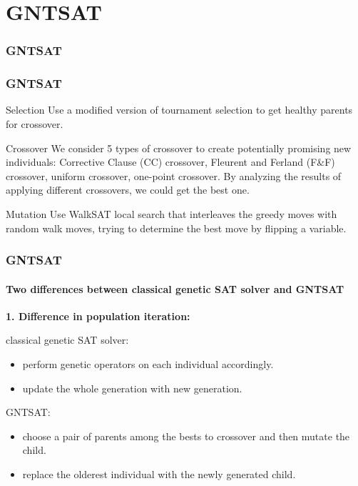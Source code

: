 \section{GNTSAT}

\begin{frame}
	\frametitle{GNTSAT}
\begin{small}
	\renewcommand{\thealgocf}{}
	\begin{algorithm}[H]
		\SetAlgoLined
		\BlankLine
		\caption{GNTSAT solver}
	\end{algorithm}
\end{small}
\end{frame}


\begin{frame}
	\frametitle{GNTSAT}
	\begin{block}{Selection}
		Use a modified version of tournament selection to get healthy parents for crossover.
	\end{block}
	\begin{block}{Crossover}
	We consider 5 types of crossover to create potentially promising new individuals: Corrective Clause (CC) crossover,
	Fleurent and Ferland (F\&F) crossover, uniform crossover, one-point crossover. By analyzing the results of applying different crossovers, we could get the best one.
	\end{block}
	\begin{block}{Mutation}
		Use WalkSAT local search that interleaves the greedy moves with random walk moves, trying to determine the best move by flipping a variable.
	\end{block}
\end{frame}
\begin{frame}[t]
	\frametitle{GNTSAT}
	\framesubtitle{Two differences between classical genetic SAT solver and GNTSAT}
	\textbf{1. Difference in population iteration:}
	\begin{block}{classical genetic SAT solver:}
		\begin{itemize}
		\item perform genetic operators on each individual accordingly.
		\item update the whole generation with new generation.
		\end{itemize}
	\end{block}
	\begin{block}{GNTSAT:}		
		\begin{itemize}
		\item choose a pair of parents among the bests to crossover and then mutate the child. 
		\item replace the olderest individual with the newly generated child.
		\end{itemize}	
	\end{block}
\end{frame}

